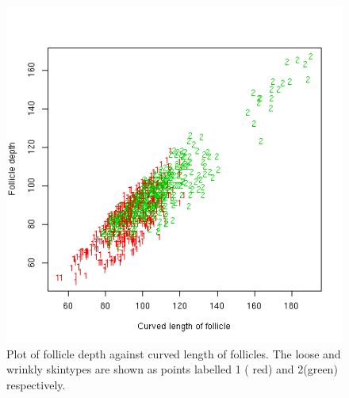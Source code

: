 %

\begin{figure}[!h]
  \centering
  \includegraphics[width=1.0\textwidth]{curvlenxfd.png}
  \caption{Plot of follicle depth against curved length of follicles. The loose and wrinkly skintypes are shown as points labelled 1 ( red) and 2(green) respectively.}
  \label{fig:curvlenxfd}
\end{figure}

%

